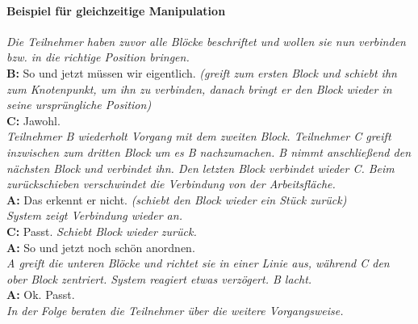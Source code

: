\paragraph{Beispiel für gleichzeitige Manipulation} %
\begin{transkript}
	\emph{Die Teilnehmer haben zuvor alle Blöcke beschriftet und wollen sie nun verbinden bzw. in die richtige Position bringen.} \\
	\textbf{B:} So und jetzt müssen wir eigentlich. \emph{(greift zum ersten Block und schiebt ihn zum Knotenpunkt, um ihn zu verbinden, danach bringt er den Block wieder in seine ursprüngliche Position)} \\
	\textbf{C:} Jawohl. \\
	\emph{Teilnehmer B wiederholt Vorgang mit dem zweiten Block. Teilnehmer C greift inzwischen zum dritten Block um es B nachzumachen. B nimmt anschließend den nächsten Block und verbindet ihn. Den letzten Block verbindet wieder C. Beim zurückschieben verschwindet die Verbindung von der Arbeitsfläche.} \\
	\textbf{A:} Das erkennt er nicht. \emph{(schiebt den Block wieder ein Stück zurück)} \\
	\emph{System zeigt Verbindung wieder an.} \\
	\textbf{C:} Passt. \emph{Schiebt Block wieder zurück.} \\
	\textbf{A:} So und jetzt noch schön anordnen. \\
	\emph{A greift die unteren Blöcke und richtet sie in einer Linie aus, während C den ober Block zentriert. System reagiert etwas verzögert. B lacht.} \\
	\textbf{A:} Ok. Passt. \\
	\emph{In der Folge beraten die Teilnehmer über die weitere Vorgangsweise.} \\
\end{transkript}

